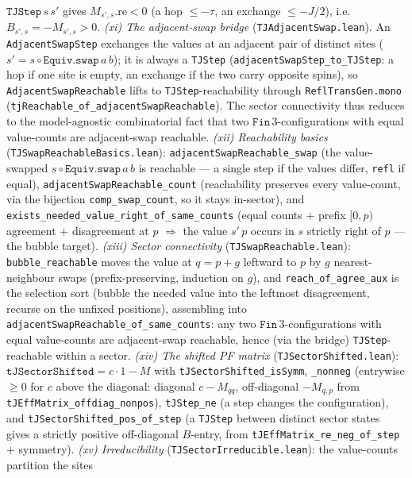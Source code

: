 \documentclass[a4paper,11pt]{article}
\begin{document}
$\texttt{TJStep}\,s\,s'$ gives $M_{s',s}.\mathrm{re}<0$ (a hop $\leq-\tau$, an exchange $\leq-J/2$),
i.e. $B_{s',s}=-M_{s',s}>0$.  \emph{(xi) The adjacent-swap bridge} (\texttt{TJAdjacentSwap.lean}).
An \texttt{AdjacentSwapStep} exchanges the values at an adjacent pair of distinct sites
($s'=s\circ\texttt{Equiv.swap}\,a\,b$); it is always a \texttt{TJStep}
(\texttt{adjacentSwapStep\_to\_TJStep}: a hop if one site is empty, an exchange if the two carry
opposite spins), so \texttt{AdjacentSwapReachable} lifts to \texttt{TJStep}-reachability through
\texttt{ReflTransGen.mono} (\texttt{tjReachable\_of\_adjacentSwapReachable}).  The sector connectivity
thus reduces to the model-agnostic combinatorial fact that two $\texttt{Fin}\,3$-configurations with
equal value-counts are adjacent-swap reachable.  \emph{(xii) Reachability basics}
(\texttt{TJSwapReachableBasics.lean}): \texttt{adjacentSwapReachable\_swap} (the value-swapped
$s\circ\texttt{Equiv.swap}\,a\,b$ is reachable --- a single step if the values differ, \texttt{refl}
if equal), \texttt{adjacentSwapReachable\_count} (reachability preserves every value-count, via the
bijection \texttt{comp\_swap\_count}, so it stays in-sector), and
\texttt{exists\_needed\_value\_right\_of\_same\_counts} (equal counts $+$ prefix $[0,p)$ agreement
$+$ disagreement at $p$ $\Rightarrow$ the value $s'\,p$ occurs in $s$ strictly right of $p$ --- the
bubble target).
\emph{(xiii) Sector connectivity} (\texttt{TJSwapReachable.lean}): \texttt{bubble\_reachable} moves
the value at $q=p+g$ leftward to $p$ by $g$ nearest-neighbour swaps (prefix-preserving, induction on
$g$), and \texttt{reach\_of\_agree\_aux} is the selection sort (bubble the needed value into the
leftmost disagreement, recurse on the unfixed positions), assembling into
\texttt{adjacentSwapReachable\_of\_same\_counts}: any two $\texttt{Fin}\,3$-configurations with equal
value-counts are adjacent-swap reachable, hence (via the bridge) \texttt{TJStep}-reachable within a
sector.  \emph{(xiv) The shifted PF matrix} (\texttt{TJSectorShifted.lean}):
$\texttt{tJSectorShifted}=c\cdot 1-M$ with \texttt{tJSectorShifted\_isSymm}, \texttt{\_nonneg}
(entrywise $\geq 0$ for $c$ above the diagonal: diagonal $c-M_{qq}$, off-diagonal $-M_{q,p}$ from
\texttt{tJEffMatrix\_offdiag\_nonpos}), \texttt{tJStep\_ne} (a step changes the configuration), and
\texttt{tJSectorShifted\_pos\_of\_step} (a \texttt{TJStep} between distinct sector states gives a
strictly positive off-diagonal $B$-entry, from \texttt{tJEffMatrix\_re\_neg\_of\_step} $+$ symmetry).
\emph{(xv) Irreducibility} (\texttt{TJSectorIrreducible.lean}): the value-counts partition the sites
\end{document}
